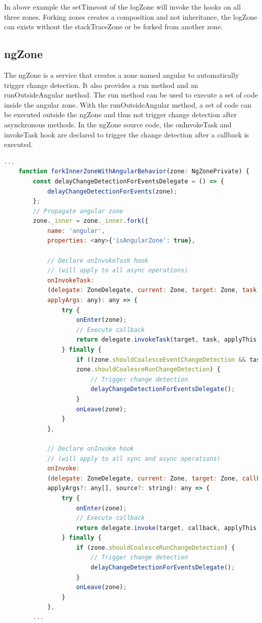 In above example the setTimeout of the logZone will invoke the hooks on all three zones. Forking zones creates a composition and not inheritance, the logZone can exists without the stackTraceZone or be forked from another zone.

\subsection{ngZone}
The ngZone is a service that creates a zone named angular to automatically trigger change detection. It also provides a run method and an runOutsideAngular method. The run method can be used to execute a set of code inside the angular zone. With the runOutsideAngular method, a set of code can be executed outside the ngZone and thus not trigger change detection after asynchronous methods. In the ngZone source code, the onInvokeTask and invokeTask hook are declared to trigger the change detection after a callback is executed.

\begin{lstlisting}[language=Javascript]
    ...
    function forkInnerZoneWithAngularBehavior(zone: NgZonePrivate) {
        const delayChangeDetectionForEventsDelegate = () => {
            delayChangeDetectionForEvents(zone);
        };
        // Propagate angular zone
        zone._inner = zone._inner.fork({
            name: 'angular',
            properties: <any>{'isAngularZone': true},
            
            // Declare onInvokeTask hook 
            // (will apply to all async operations)
            onInvokeTask:
            (delegate: ZoneDelegate, current: Zone, target: Zone, task: Task, applyThis: any,
            applyArgs: any): any => {
                try {
                    onEnter(zone);
                    // Execute callback
                    return delegate.invokeTask(target, task, applyThis, applyArgs);
                } finally {
                    if ((zone.shouldCoalesceEventChangeDetection && task.type === 'eventTask') ||
                    zone.shouldCoalesceRunChangeDetection) {
                        // Trigger change detection
                        delayChangeDetectionForEventsDelegate();
                    }
                    onLeave(zone);
                }
            },
            
            // Declare onInvoke hook 
            // (will apply to all sync and async operations)
            onInvoke:
            (delegate: ZoneDelegate, current: Zone, target: Zone, callback: Function, applyThis: any,
            applyArgs?: any[], source?: string): any => {
                try {
                    onEnter(zone);
                    // Execute callback
                    return delegate.invoke(target, callback, applyThis, applyArgs, source);
                } finally {
                    if (zone.shouldCoalesceRunChangeDetection) {
                        // Trigger change detection
                        delayChangeDetectionForEventsDelegate();
                    }
                    onLeave(zone);
                }
            },
        ...
\end{lstlisting}

